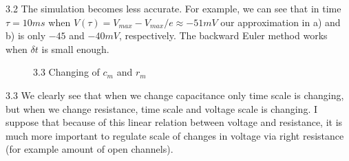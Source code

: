 \documentclass[]{report}
\begin{document}
3.2 The simulation becomes less accurate. For example, we can see that in time $\tau=10 ms$ when $V(\tau)=V_{max}-V_{max}/e \approx -51 mV $ our approximation in a) and b) is only $-45$ and $-40 mV$, respectively.    The backward Euler method works when $\delta t$ is small enough. 
 
\begin{figure}[h!]
	\centering
	\hfill
	\caption*{3.3 Changing of $c_m$ and $r_m$}
	
\end{figure}
3.3 We clearly see that when we change capacitance only time scale is changing, but when we change resistance, time scale and voltage scale is changing. I suppose that because of this linear relation between voltage and resistance, it is much more important to regulate scale of changes in voltage via right resistance (for example amount of open channels).  
\end{document}
